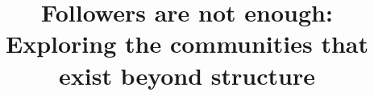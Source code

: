 \documentclass[letterpaper]{article}
\begin{document}
\title{
Followers are not enough: Exploring the communities that exist beyond structure \\
 }

\maketitle

\begin{abstract}
\begin{quote}



\end{quote}
\end{abstract}










\end{document}
